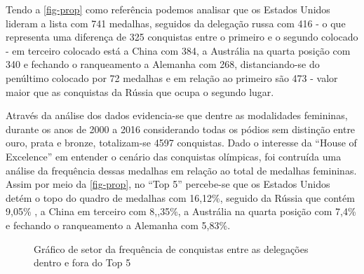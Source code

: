 \documentclass[
]{estat/estat}
\begin{document}
Tendo a \ref{fig-prop} como referência podemos analisar que os Estados
Unidos lideram a lista com 741 medalhas, seguidos da delegação russa com
416 - o que representa uma diferença de 325 conquistas entre o primeiro
e o segundo colocado - em terceiro colocado está a China com 384, a
Austrália na quarta posição com 340 e fechando o ranqueamento a Alemanha
com 268, distanciando-se do penúltimo colocado por 72 medalhas e em
relação ao primeiro são 473 - valor maior que as conquistas da Rússia
que ocupa o segundo lugar.

Através da análise dos dados evidencia-se que dentre as modalidades
femininas, durante os anos de 2000 a 2016 considerando todas os pódios
sem distinção entre ouro, prata e bronze, totalizam-se 4597 conquistas.
Dado o interesse da ``House of Excelence'' em entender o cenário das
conquistas olímpicas, foi contruída uma análise da frequência dessas
medalhas em relação ao total de medalhas femininas. Assim por meio da
\ref{fig-prop}, no ``Top 5'' percebe-se que os Estados Unidos detém o
topo do quadro de medalhas com 16,12\%, seguido da Rússia que contém
9,05\% , a China em terceiro com 8,,35\%, a Austrália na quarta posição
com 7,4\% e fechando o ranqueamento a Alemanha com 5,83\%.

\begin{figure}[H]

\caption{\label{fig-setor}Gráfico de setor da frequência de conquistas
entre as delegações dentro e fora do Top 5}


\end{figure}%
\end{document}
